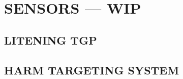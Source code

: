 \chapter{SENSORS --- WIP}
\localtableofcontents
\cleardoublepage

\section{LITENING TGP}

\clearpage 

\section{HARM TARGETING SYSTEM}

\cleardoublepage